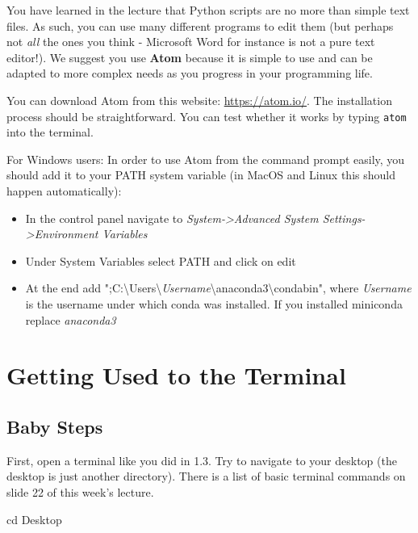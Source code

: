 You have learned in the lecture that Python scripts are no more than simple text files. As such, you can use many different programs to edit them (but perhaps not \textit{all} the ones you think - Microsoft Word for instance is not a pure text editor!). We suggest you use \textbf{Atom} because it is simple to use and can be adapted to more complex needs as you progress in your programming life.

\vspace{1em}

\noindent You can download Atom from this website: \url{https://atom.io/}. The installation process should be straightforward. You can test whether it works by typing \texttt{atom} into the terminal.

\noindent For Windows users: In order to use Atom from the command prompt easily, you should add it to your PATH system variable (in MacOS and Linux this should happen automatically): 

\begin{itemize}
    \item In the control panel navigate to \textit{System->Advanced System Settings->Environment Variables}
    \item Under System Variables select PATH and click on edit
    \item At the end add ";C:\textbackslash Users\textbackslash \textit{Username}\textbackslash anaconda3\textbackslash condabin", where \textit{Username} is the username under which conda was installed. If you installed miniconda replace \textit{anaconda3}
\end{itemize}

\section{Getting Used to the Terminal}

\subsection{Baby Steps}

First, open a terminal like you did in 1.3. Try to navigate to your desktop (the desktop is just another directory). There is a list of basic terminal commands on slide 22 of this week's lecture.

\vspace{1em}

\begin{solution}
    \begin{outputcode}
cd Desktop
    \end{outputcode}
\end{solution}

